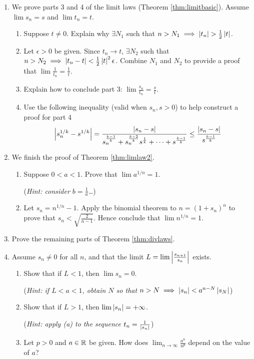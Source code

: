 \begin{exercisessec}{}{}
\begin{enumerate}
	\item\label{exs:limitlawsfinish} We prove parts 3 and 4 of the limit laws (Theorem \ref{thm:limitbasic}). Assume $\lim s_n= s$ and $\lim t_n=t$.
	\begin{enumerate}
	  \item Suppose $t\neq 0$. Explain why $\exists N_1$ such that $n>N_1\implies \nm{t_n}>\frac 12\nm t$.
	  \item Let $\epsilon>0$ be given. Since $t_n\to t$, $\exists N_2$ such that $n>N_2\implies \left| t_n-t\right|<\frac 12\left| t\right|^2\epsilon$. Combine $N_1$ and $N_2$ to provide a proof that $\lim\frac 1{t_n}=\frac 1t$.
	  \item Explain how to conclude part 3: $\lim\frac{s_n}{t_n}=\frac st$.
	  \item Use the following inequality (valid when $s_n,s>0$) to help construct a proof for part 4
		\[\left| s_n^{1/k}-s^{1/k}\right|=\frac{\left| s_n-s\right|}{{s_n^{\frac{k-1}k}+s_n^{\frac{k-2}k}s^{\frac 1k}+\cdots +s^{\frac{k-1}k}}}\le \frac{\left| s_n-s\right|}{s^{\frac{k-1}k}}\]
 	\end{enumerate}


		\item\label{exs:nrootlimit}
		We finish the proof of Theorem \ref{thm:limlaw2}.
		\begin{enumerate}
		  \item Suppose $0<a<1$. Prove that $\lim a^{1/n}=1$.\par
			(\emph{Hint: consider $b=\frac 1a$\ldots})
			\item Let $s_n=n^{1/n}-1$. Apply the binomial theorem to $n=(1+s_n)^n$ to prove that $s_n<\sqrt{\frac 2{n-1}}$.
			Hence conclude that $\lim n^{1/n}=1$.
		\end{enumerate}
		
		
		\item Prove the remaining parts of Theorem \ref{thm:divlaws}.
		
		
		\item%
  	Assume $s_n\neq 0$ for all $n$, and that the limit $L=\lim\smash[b]{\left| \frac{s_{n+1}}{s_n}\right|}$ exists.
  \begin{enumerate}
	  \item Show that if $L<1$, then $\lim s_n=0$.\par
	  (\emph{Hint: if $L<a<1$, obtain $N$ so that $n>N\implies\left| s_n\right|<a^{n-N}\left| s_N\right|$})
	  \item Show that if $L>1$, then $\lim\left| s_n\right|=+\infty$.\par
	  (\emph{Hint: apply (a) to the sequence $t_n=\frac 1{\left| s_n\right|}$})
	  \item%
	  Let $p>0$ and $a\in\mathbb{R}$ be given. How does $\lim_{n\to\infty}\frac{a^n}{n^p}$ depend on the value of $a$?
  \end{enumerate}

	\end{enumerate}
\end{exercisessec}

